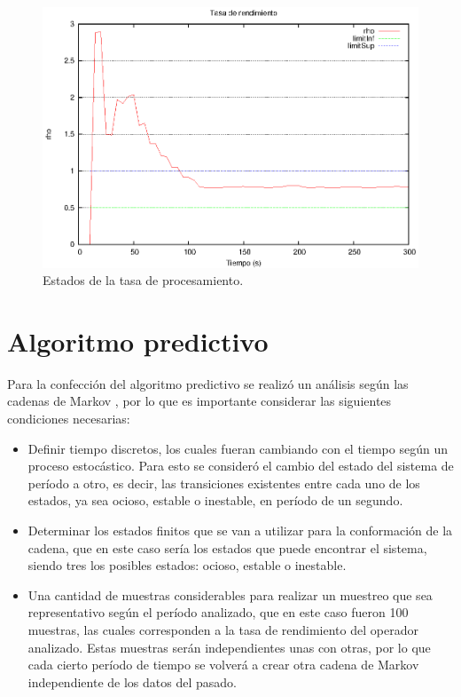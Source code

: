 \begin{figure}[hb!]
  \centering
    \includegraphics[scale=0.8]{images/Umbrales.eps}
  \caption{Estados de la tasa de procesamiento.}
  \label{fig:umbrales}
\end{figure}


\section{Algoritmo predictivo}
Para la confección del algoritmo predictivo se realizó un análisis según las cadenas de Markov \citep{ching2006markov}, por lo que es importante considerar las siguientes condiciones necesarias:

\begin{itemize}
	\item Definir tiempo discretos, los cuales fueran cambiando con el tiempo según un proceso estocástico. Para esto se consideró el cambio del estado del sistema de período a otro, es decir, las transiciones existentes entre cada uno de los estados, ya sea ocioso, estable o inestable, en período de un segundo.
	\item Determinar los estados finitos que se van a utilizar para la conformación de la cadena, que en este caso sería los estados que puede encontrar el sistema, siendo tres los posibles estados: ocioso, estable o inestable.
	\item Una cantidad de muestras considerables para realizar un muestreo que sea representativo según el período analizado, que en este caso fueron 100 muestras, las cuales corresponden a la tasa de rendimiento del operador analizado. Estas muestras serán independientes unas con otras, por lo que cada cierto período de tiempo se volverá a crear otra cadena de Markov independiente de los datos del pasado.
\end{itemize}

